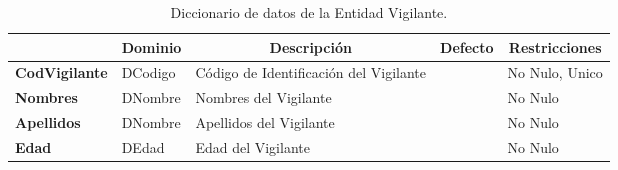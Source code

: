 \begin{table}[H]
\centering
\caption{Diccionario de datos de la Entidad Vigilante.}
\label{tab-Dicc-26}
\begin{tabular}{>{\bfseries}m{4.0cm}>{}m{3.0cm}>{}m{6.0cm}>{}m{5.0cm}>{}m{2.0cm}}
\toprule
\multicolumn{1}{c}{\textbf{Atributo}} & \multicolumn{1}{c}{\textbf{Dominio}} & \multicolumn{1}{c}{\textbf{Descripción}} & \multicolumn{1}{c}{\textbf{Defecto}} & \multicolumn{1}{c}{\textbf{Restricciones}} \\ \midrule
CodVigilante	&	DCodigo	&	Código de Identificación del Vigilante	&		&	No Nulo, Unico\\
Nombres	&	DNombre	&	Nombres del Vigilante	&		&	No Nulo\\
Apellidos	&	DNombre	&	Apellidos del Vigilante	&		&	No Nulo\\
Edad	&	DEdad	&	Edad del Vigilante	&		&	No Nulo\\
\bottomrule
\end{tabular}
\end{table}

